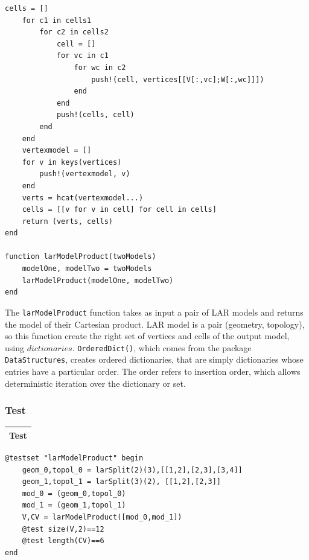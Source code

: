 \documentclass{article}
\begin{document}
\begin{flushleft}
\begin{list}{}{}
\begin{Verbatim}[tabsize=4]
    cells = []
    for c1 in cells1
        for c2 in cells2
            cell = []
            for vc in c1
                for wc in c2 
                    push!(cell, vertices[[V[:,vc];W[:,wc]]])
                end
            end
            push!(cells, cell)
        end
    end
    vertexmodel = []
    for v in keys(vertices)
        push!(vertexmodel, v)
    end
    verts = hcat(vertexmodel...)
    cells = [[v for v in cell] for cell in cells]
    return (verts, cells)
end

function larModelProduct(twoModels)
    modelOne, modelTwo = twoModels
    larModelProduct(modelOne, modelTwo)
end
\end{Verbatim}
\end{list}
\vspace{-1ex}
\footnotesize\addtolength{\baselineskip}{-1ex}
\end{flushleft}
The \texttt{larModelProduct} function takes as input a pair of LAR models and returns the model of their Cartesian product. LAR model is a pair (geometry, topology), so this function create the right set of vertices and cells of the output model, using $dictionaries$. \texttt{OrderedDict()}, which comes from the package \texttt{DataStructures}, creates ordered dictionaries, that are simply dictionaries whose entries have a particular order. The order refers to insertion order, which allows deterministic iteration over the dictionary or set.
\newpage
\subsubsection{Test}
\begin{center}
\begin{tabular}{|p{16cm}|}
\hline
\cellcolor[gray]{.9}Test\\
\hline
\end{tabular}
\end{center}

\begin{flushleft}\small
\begin{list}{}{} \item
\begin{Verbatim}[tabsize=4]
@testset "larModelProduct" begin
	geom_0,topol_0 = larSplit(2)(3),[[1,2],[2,3],[3,4]]
	geom_1,topol_1 = larSplit(3)(2), [[1,2],[2,3]]
	mod_0 = (geom_0,topol_0)
	mod_1 = (geom_1,topol_1)
	V,CV = larModelProduct([mod_0,mod_1])
	@test size(V,2)==12
	@test length(CV)==6
end

\end{Verbatim}
\end{list}
\end{flushleft}
\end{document}
